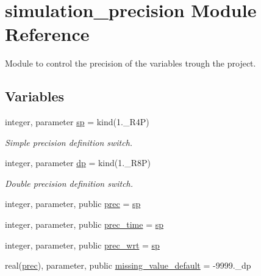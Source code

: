 \hypertarget{namespacesimulation__precision}{}\section{simulation\+\_\+precision Module Reference}
\label{namespacesimulation__precision}


Module to control the precision of the variables trough the project.  


\subsection*{Variables}
\begin{DoxyCompactItemize}
\item 
integer, parameter \hyperlink{namespacesimulation__precision_a3657003647318cfe37c797ab37448a2e}{sp} = kind(1.\+\_\+\+R4P)
\begin{DoxyCompactList}\small\item\em Simple precision definition switch. \end{DoxyCompactList}\item 
integer, parameter \hyperlink{namespacesimulation__precision_af01fc62f503e0ff9a95c9ee2960c9a7f}{dp} = kind(1.\+\_\+\+R8P)
\begin{DoxyCompactList}\small\item\em Double precision definition switch. \end{DoxyCompactList}\item 
integer, parameter, public \hyperlink{namespacesimulation__precision_a6d3bcd3b4ff2cfb92ec9fe36ecad405b}{prec} = \hyperlink{namespacesimulation__precision_a3657003647318cfe37c797ab37448a2e}{sp}
\item 
integer, parameter, public \hyperlink{namespacesimulation__precision_a09a1db15abeed81ff2f54b363128ffed}{prec\+\_\+time} = \hyperlink{namespacesimulation__precision_a3657003647318cfe37c797ab37448a2e}{sp}
\item 
integer, parameter, public \hyperlink{namespacesimulation__precision_a049e8de4fad9c285d2cc71e8982e2971}{prec\+\_\+wrt} = \hyperlink{namespacesimulation__precision_a3657003647318cfe37c797ab37448a2e}{sp}
\item 
real(\hyperlink{namespacesimulation__precision_a6d3bcd3b4ff2cfb92ec9fe36ecad405b}{prec}), parameter, public \hyperlink{namespacesimulation__precision_a5983f631bbe7a6e5d43d2a458db81460}{missing\+\_\+value\+\_\+default} = -\/9999.\+\_\+dp
\item 

\end{DoxyCompactItemize}
